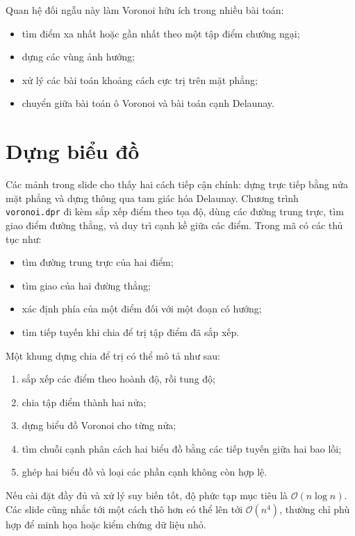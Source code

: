 \documentclass[11pt]{article}
\newcommand{\Oh}{\mathcal{O}}
\begin{document}
Quan hệ đối ngẫu này làm Voronoi hữu ích trong nhiều bài toán:
\begin{itemize}
  \item tìm điểm xa nhất hoặc gần nhất theo một tập điểm chướng ngại;
  \item dựng các vùng ảnh hưởng;
  \item xử lý các bài toán khoảng cách cực trị trên mặt phẳng;
  \item chuyển giữa bài toán ô Voronoi và bài toán cạnh Delaunay.
\end{itemize}

\section{Dựng biểu đồ}

Các mảnh trong slide cho thấy hai cách tiếp cận chính: dựng trực tiếp bằng
nửa mặt phẳng và dựng thông qua tam giác hóa Delaunay. Chương trình
\texttt{voronoi.dpr} đi kèm sắp xếp điểm theo tọa độ, dùng các đường trung
trực, tìm giao điểm đường thẳng, và duy trì cạnh kề giữa các điểm. Trong mã có
các thủ tục như:
\begin{itemize}
  \item tìm đường trung trực của hai điểm;
  \item tìm giao của hai đường thẳng;
  \item xác định phía của một điểm đối với một đoạn có hướng;
  \item tìm tiếp tuyến khi chia để trị tập điểm đã sắp xếp.
\end{itemize}

Một khung dựng chia để trị có thể mô tả như sau:
\begin{enumerate}
  \item sắp xếp các điểm theo hoành độ, rồi tung độ;
  \item chia tập điểm thành hai nửa;
  \item dựng biểu đồ Voronoi cho từng nửa;
  \item tìm chuỗi cạnh phân cách hai biểu đồ bằng các tiếp tuyến giữa hai bao
  lồi;
  \item ghép hai biểu đồ và loại các phần cạnh không còn hợp lệ.
\end{enumerate}

Nếu cài đặt đầy đủ và xử lý suy biến tốt, độ phức tạp mục tiêu là
\(\Oh(n\log n)\). Các slide cũng nhắc tới một cách thô hơn có thể lên tới
\(\Oh(n^4)\), thường chỉ phù hợp để minh họa hoặc kiểm chứng dữ liệu nhỏ.
\end{document}

